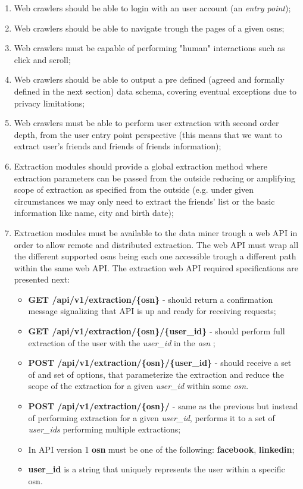 \begin{enumerate}
    \item Web crawlers should be able to login with an user account (an \textit{entry point});
    \item Web crawlers should be able to navigate trough the pages of a given \glspl{osn};
    \item Web crawlers must be capable of performing "human" interactions such as click and scroll;
    \item Web crawlers should be able to output a pre defined (agreed and formally defined in the next section) data schema, covering eventual
    exceptions due to privacy limitations;
    \item Web crawlers must be able to perform user extraction with second order depth, from the user entry point perspective (this means that we want to extract user's friends and friends of friends information);
    \item Extraction modules should provide a global extraction method where extraction parameters can be passed from the outside reducing or amplifying scope of extraction as specified from the outside (e.g. under given circumstances we may only need to extract the friends' list or the basic information like name, city and birth date);
    \item Extraction modules must be available to the data miner trough a web API in order to allow remote and distributed extraction. The web API must wrap all the different supported \glspl{osn} being each one accessible trough a different path within the same web API. The extraction web API required specifications are presented next:
    \begin{itemize}
        \item \textbf{GET /api/v1/extraction/\{osn\}} - should return a confirmation message signalizing that API is up and ready for receiving requests;
        \item \textbf{GET /api/v1/extraction/\{osn\}/\{user\_id\}} - should perform full extraction of the user with the \textit{user\_id} in the \textit{osn} ;
        \item \textbf{POST /api/v1/extraction/\{osn\}/\{user\_id\}} - should receive a set of and set of options, that parameterize the extraction and reduce the scope of the extraction for a given \textit{user\_id} within some \textit{osn}.
        \item \textbf{POST /api/v1/extraction/\{osn\}/} - same as the previous but instead of performing extraction for a given \textit{user\_id}, performs it to a set of \textit{user\_ids} performing multiple extractions;
        \item In API version 1 \textbf{osn} must be one of the following: \textbf{facebook}, \textbf{linkedin};
        \item \textbf{user\_id} is a string that uniquely represents the user within a specific \gls{osn}.
    \end{itemize}
\end{enumerate}

